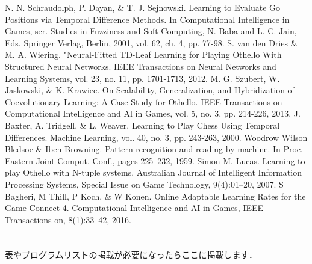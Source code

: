 \documentclass{suribt}
\begin{document}
\begin{thebibliography}{}
  N. N. Schraudolph, P. Dayan, \& T. J. Sejnowski. Learning to Evaluate Go Positions via Temporal Difference Methods. In Computational Intelligence in Games, ser. Studies in Fuzziness and Soft Computing, N. Baba and L. C. Jain, Eds. Springer Verlag, Berlin, 2001, vol. 62, ch. 4, pp. 77-98.
  S. van den Dries \& M. A. Wiering. "Neural-Fitted TD-Leaf Learning for Playing Othello With Structured Neural Networks. IEEE Transactions on Neural Networks and Learning Systems, vol. 23, no. 11, pp. 1701-1713, 2012.
  M. G. Szubert, W. Jaskowski, \& K. Krawiec. On Scalability, Generalization, and Hybridization of Coevolutionary Learning: A Case Study for Othello. IEEE Transactions on Computational Intelligence and Al in Games, vol. 5, no. 3, pp. 214-226, 2013.
  J. Baxter, A. Tridgell, \& L. Weaver. Learning to Play Chess Using Temporal Differences. Machine Learning, vol. 40, no. 3, pp. 243-263, 2000.
  Woodrow Wilson Bledsoe \& Iben Browning. Pattern recognition and reading by machine. In Proc. Eastern Joint Comput. Conf., pages 225–232, 1959.
  Simon M. Lucas. Learning to play Othello with N-tuple systems. Australian Journal of Intelligent Information Processing Systems, Special Issue on Game Technology, 9(4):01–20, 2007.
  S Bagheri, M Thill, P Koch, \& W Konen. Online Adaptable Learning Rates for the Game Connect-4. Computational Intelligence
and AI in Games, IEEE Transactions on, 8(1):33–42, 2016.
\end{thebibliography}

\appendix
\chapter{}
表やプログラムリストの掲載が必要になったらここに掲載します．
\end{document}
